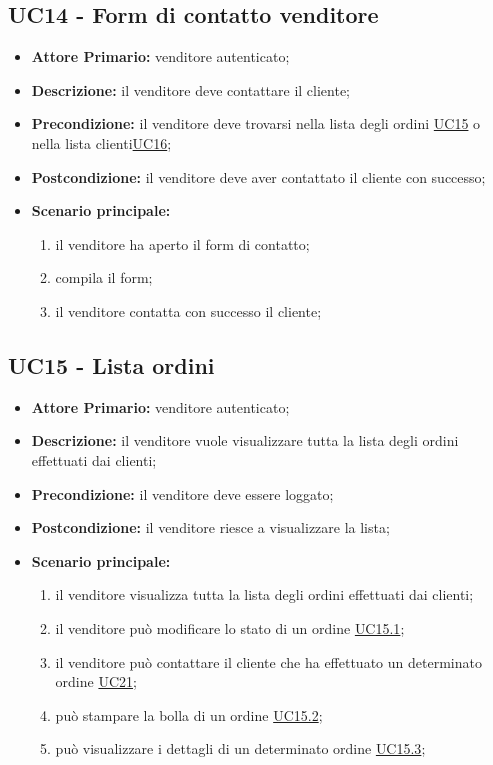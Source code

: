 \subsection{UC14 - Form di contatto venditore}
\label{UC14}
\begin{itemize}
    \item \textbf{Attore Primario:} venditore autenticato;
    \item \textbf{Descrizione:} il venditore deve contattare il cliente;
    \item \textbf{Precondizione:} il venditore deve trovarsi nella lista degli ordini \hyperref[UC15]{UC15} o nella lista clienti\hyperref[UC16]{UC16};
    \item \textbf{Postcondizione:} il venditore deve aver contattato il cliente con successo;
    \item \textbf{Scenario principale:}
    \begin{enumerate}
        \item il venditore ha aperto il form di contatto;
        \item compila il form;
        \item il venditore contatta con successo il cliente;
    \end{enumerate}
\end{itemize}

\subsection{UC15 - Lista ordini}
\label{UC15}
\begin{itemize}
    \item \textbf{Attore Primario:} venditore autenticato;
    \item \textbf{Descrizione:} il venditore vuole visualizzare tutta la lista degli ordini effettuati dai clienti;
    \item \textbf{Precondizione:} il venditore deve essere loggato;
    \item \textbf{Postcondizione:} il venditore riesce a visualizzare la lista;
    \item \textbf{Scenario principale:}
    \begin{enumerate}
        \item il venditore visualizza tutta la lista degli ordini effettuati dai clienti;
         \item il venditore può modificare lo stato di un ordine \hyperref[UC15.1]{UC15.1};
        \item il venditore può contattare il cliente che ha effettuato un determinato ordine \hyperref[UC21]{UC21};
        \item può stampare la bolla di un ordine \hyperref[UC15.2]{UC15.2};
        \item può visualizzare i dettagli di un determinato ordine \hyperref[UC15.3]{UC15.3}; 
    \end{enumerate}
\end{itemize}

